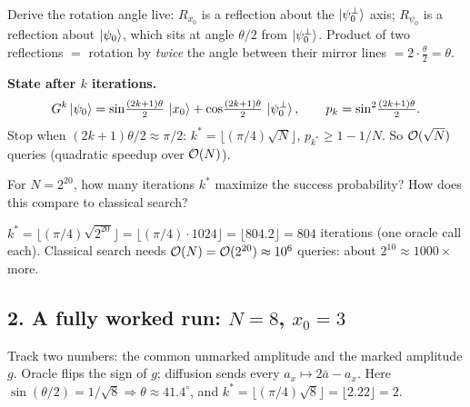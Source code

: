 \documentclass[11pt]{article}
\begin{document}
Derive the rotation angle live: $R_{x_0}$ is a reflection about the
$\ket{\psi_0^\perp}$ axis; $R_{\psi_0}$ is a reflection about $\ket{\psi_0}$, which
sits at angle $\theta/2$ from $\ket{\psi_0^\perp}$. Product of two reflections $=$
rotation by \emph{twice} the angle between their mirror lines $=2\cdot\tfrac\theta2=\theta$.


\begin{board}
\textbf{State after $k$ iterations.}
\[
  G^k\ket{\psi_0}=\sin\!\tfrac{(2k+1)\theta}{2}\,\ket{x_0}+\cos\!\tfrac{(2k+1)\theta}{2}\,\ket{\psi_0^\perp},
  \qquad
  p_k=\sin^2\!\tfrac{(2k+1)\theta}{2}.
\]
Stop when $(2k{+}1)\theta/2\approx\pi/2$: $k^\ast=\lfloor(\pi/4)\sqrt N\rfloor$,
$p_{k^\ast}\ge1-1/N$. So $\mathcal{O}(\sqrt N)$ queries (quadratic speedup over $\mathcal{O}(N)$).
\end{board}

\begin{inclass}\label{ic:l3-count}
For $N=2^{20}$, how many iterations $k^\ast$ maximize the success probability? How
does this compare to classical search?
\end{inclass}
\begin{answer}
$k^\ast=\lfloor(\pi/4)\sqrt{2^{20}}\rfloor=\lfloor(\pi/4)\cdot1024\rfloor
=\lfloor 804.2\rfloor=804$ iterations (one oracle call each). Classical search needs
$\mathcal{O}(N)=\mathcal{O}(2^{20})\approx10^6$ queries: about $2^{10}\approx1000\times$ more. \checkmark
\end{answer}

\subsection*{2. A fully worked run: $N=8$, $x_0=3$ }
Track two numbers: the common unmarked amplitude and the marked amplitude
$g$. Oracle flips the sign of $g$; diffusion sends every $a_x\mapsto2\bar a-a_x$.
Here $\sin(\theta/2)=1/\sqrt8\Rightarrow\theta\approx41.4^\circ$, and
$k^\ast=\lfloor(\pi/4)\sqrt8\rfloor=\lfloor2.22\rfloor=2$.
\end{document}
